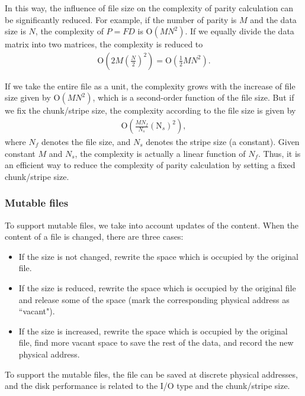 \documentclass[journal]{IEEEtran}
\begin{document}
In this way, the influence of file size on the complexity of parity calculation can be significantly reduced. For example, if the number of parity is $M$ and the data size is $N$, the complexity of $P=FD$ is ${\mathrm O}(M{{N}^{2}})$. If we equally divide the data matrix into two matrices, the complexity is reduced to 
\begin{align}
    {\mathrm O}\left( 2M{{\left( \frac{N}{2} \right)}^{2}} \right)={\mathrm O}\left( \frac{1}{2}M{{N}^{2}} \right).
\end{align}

If we take the entire file as a unit, the complexity grows with the increase of file size given by ${\mathrm O}(M{{N}^{2}})$, which is a second-order function of the file size. But if we fix the chunk/stripe size, the complexity according to the file size is given by
\begin{align}
    {\mathrm O}\left( \frac{M{{N}_{f}}}{{{N}_{s}}}{{\left( {{\text{N}}_{s}} \right)}^{2}} \right),
\end{align}
where $N_f$ denotes the file size, and $N_s$ denotes the stripe size (a constant). Given constant $M$ and $N_s$, the complexity is actually a linear function of $N_f$. Thus, it is an efficient way to reduce the complexity of parity calculation by setting a fixed chunk/stripe size.

\subsubsection{Mutable files}
To support mutable files, we take into account updates of the content. When the content of a file is changed, there are three cases:
\begin{itemize}
    \item If the size is not changed, rewrite the space which is occupied by the original file.
    \item If the size is reduced, rewrite the space which is occupied by the original file and release some of the space (mark the corresponding physical address as ``vacant").
    \item If the size is increased, rewrite the space which is occupied by the original file, find more vacant space to save the rest of the data, and record the new physical address.
\end{itemize}

To support the mutable files, the file can be saved at discrete physical addresses, and the disk performance is related to the I/O type and the chunk/stripe size.
\end{document}
